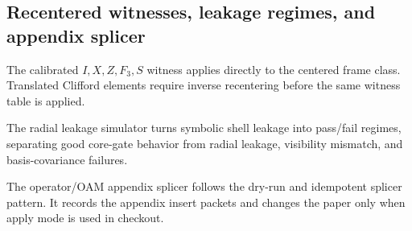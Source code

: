 \subsection{Recentered witnesses, leakage regimes, and appendix splicer}
\label{sec:bt1580-bt1582-recenter-leakage-splice}

The calibrated $I,X,Z,F_3,S$ witness applies directly to the centered frame class.  Translated Clifford elements require inverse recentering before the same witness table is applied.

The radial leakage simulator turns symbolic shell leakage into pass/fail regimes, separating good core-gate behavior from radial leakage, visibility mismatch, and basis-covariance failures.

The operator/OAM appendix splicer follows the dry-run and idempotent splicer pattern.  It records the appendix insert packets and changes the paper only when apply mode is used in checkout.
